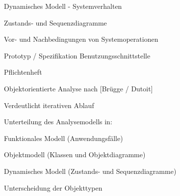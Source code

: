 \documentclass[a4paper]{article}
\begin{document}
\begin{multicols}{3}
\begin{itemize*}
\begin{itemize*}
            \item Dynamisches Modell - Systemverhalten
                  \begin{itemize*}
                    \item Zustands- und Sequenzdiagramme
                  \end{itemize*}
            \item Vor- und Nachbedingungen von Systemoperationen
            \item Prototyp / Spezifikation Benutzungsschnittstelle
            \item Pflichtenheft
          \end{itemize*}
    \item Objektorientierte Analyse nach [Brügge / Dutoit]
          \begin{itemize*}
            \item Verdeutlicht iterativen Ablauf
            \item Unterteilung des Analysemodells in:
                  \begin{itemize*}
                    \item Funktionales Modell (Anwendungsfälle)
                    \item Objektmodell (Klassen und Objektdiagramme)
                    \item Dynamisches Modell (Zustands- und Sequenzdiagramme)
                    \item Unterscheidung der Objekttypen
                  \end{itemize*}
          \end{itemize*}
  \end{itemize*}



\end{multicols}
\end{document}
